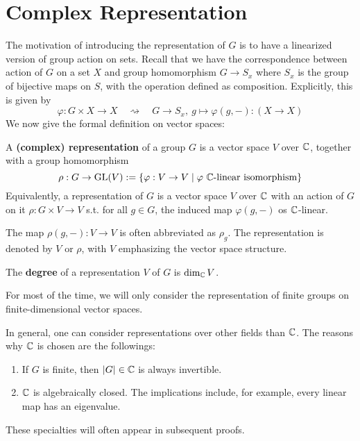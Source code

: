 \documentclass{article}
\begin{document}

\tableofcontents
\newpage

\section{Complex Representation}

\textstart
The motivation of introducing the representation of $G$ is to have a linearized version of group action on sets. Recall that we have the correspondence between action of $G$ on a set $X$ and group homomorphism $G \to S_x$ where $S_x$ is the group of bijective maps on $S$, with the operation defined as composition. Explicitly, this is given by
\[
    \varphi: G \times X \to X \quad \rightsquigarrow \quad G \to S_x,\ g \mapsto \varphi(g, -) : (X \to X) 
\]
We now give the formal definition on vector spaces:

\begin{definition}[Representation]
    A \textbf{(complex) representation} of a group $G$ is a vector space $V$ over $\mathbb{C}$, together with a group homomorphism 
    \[
        \rho: G \to \mathrm{GL}(V) := \{ \varphi: V \to V \mid \varphi \text{ $\mathbb{C}$-linear isomorphism} \}
    \]
    Equivalently, a representation of $G$ is a vector space $V$ over $\mathbb{C}$ with an action of $G$ on it $\rho: G \times V \to V$ s.t. for all $g \in G$, the induced map $\varphi(g, -)$ os $\mathbb{C}$-linear.
\end{definition}

\begin{notation}
    The map $\rho(g, -): V \to V$ is often abbreviated as $\rho_g$. The representation is denoted by $V$ or $\rho$, with $V$ emphasizing the vector space structure.
\end{notation}

\begin{definition}
    The \textbf{degree} of a representation $V$ of $G$ is $\dim_{\mathbb{C}}V$. 
\end{definition}

\textstart
For most of the time, we will only consider the representation of finite groups on finite-dimensional vector spaces.

\begin{remark}
    In general, one can consider representations over other fields than $\mathbb{C}$. The reasons why $\mathbb{C}$ is chosen are the followings:
    \begin{enumerate}[label=\arabic*)]
        \item If $G$ is finite, then $\left|G\right| \in \mathbb{C}$ is always invertible.
        \item $\mathbb{C}$ is algebraically closed. The implications include, for example, every linear map has an eigenvalue.
    \end{enumerate}
    These specialties will often appear in subsequent proofs. 
\end{remark}
\end{document}
